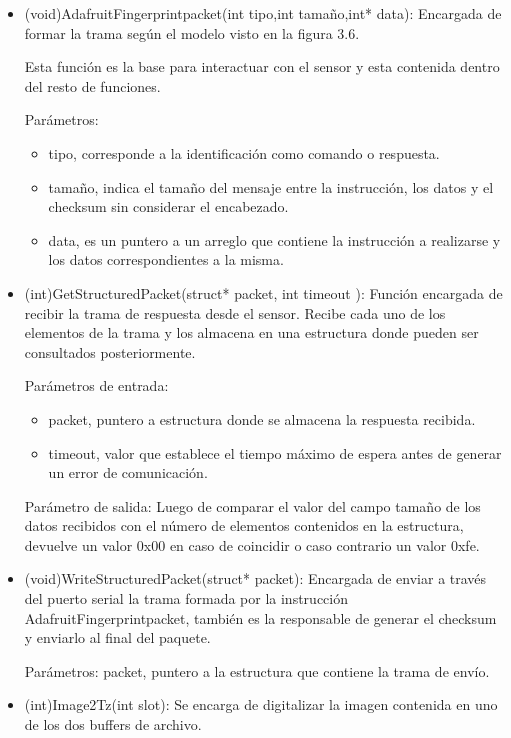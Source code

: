 \begin{itemize}

\item (void)AdafruitFingerprintpacket(int tipo,int tamaño,int* data): Encargada de formar la trama según el modelo visto en la figura 3.6.

Esta función es la base para interactuar con el sensor y esta contenida dentro del resto de funciones.

Parámetros: 
	\begin{itemize}
	\item tipo, corresponde a la identificación como comando o respuesta.
	\item tamaño, indica el tamaño del mensaje entre la instrucción, los datos y el checksum sin 		considerar el encabezado.
	\item data, es un puntero a un arreglo que contiene la instrucción a realizarse y los datos 		correspondientes a la misma.
	\end{itemize}  

\item (int)GetStructuredPacket(struct* packet, int timeout ): Función encargada de recibir la trama de respuesta desde el sensor. Recibe cada uno de los elementos de la trama y los almacena en una estructura donde pueden ser consultados posteriormente.

Parámetros de entrada: 
\begin{itemize}
\item packet, puntero a estructura donde se almacena la respuesta recibida.
\item timeout, valor que establece el tiempo máximo de espera antes de generar un error de comunicación.

\end{itemize}

Parámetro de salida: Luego de comparar el valor del campo tamaño de los datos recibidos con el número de elementos contenidos en la estructura, devuelve un valor 0x00 en caso de coincidir o caso contrario un valor 0xfe.

\item (void)WriteStructuredPacket(struct* packet): Encargada de enviar a través del puerto serial la trama formada por la instrucción AdafruitFingerprintpacket, también es la responsable de generar el checksum y enviarlo al final del paquete.

Parámetros: packet, puntero a la estructura que contiene la trama de envío.

\item (int)Image2Tz(int slot): Se encarga de digitalizar la imagen contenida en uno de los dos buffers de archivo.


\end{itemize}
